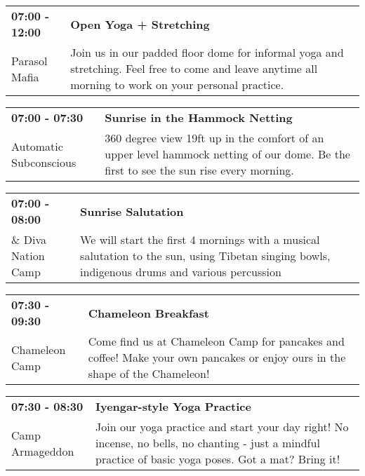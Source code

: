 \begin{tabular}{ p{1in} p{2.2in} }
    \textbf{07:00 - 12:00} & \textbf{Open Yoga + Stretching} \\
    Parasol Mafia \newline  & Join us in our padded floor dome for informal yoga and stretching. Feel free to come and leave anytime all morning to work on your personal practice. \\
    \hline 
\end{tabular}
    
\begin{tabular}{ p{1in} p{2.2in} }
    \textbf{07:00 - 07:30} & \textbf{Sunrise in the Hammock Netting} \\
    Automatic Subconscious \newline  & 360 degree view 19ft up in the comfort of an upper level hammock netting of our dome. Be the first to see the sun rise every morning. \\
    \hline 
\end{tabular}
    
\begin{tabular}{ p{1in} p{2.2in} }
    \textbf{07:00 - 08:00} & \textbf{Sunrise Salutation} \\
    \& \newline Diva Nation Camp & We will start the first 4 mornings with a musical salutation to the sun, using Tibetan singing bowls, indigenous drums and various percussion \\
    \hline 
\end{tabular}
    
\begin{tabular}{ p{1in} p{2.2in} }
    \textbf{07:30 - 09:30} & \textbf{Chameleon Breakfast} \\
    Chameleon Camp \newline  & Come find us at Chameleon Camp for pancakes and coffee! Make your own pancakes or enjoy ours in the shape of the Chameleon! \\
    \hline 
\end{tabular}
    
\begin{tabular}{ p{1in} p{2.2in} }
    \textbf{07:30 - 08:30} & \textbf{Iyengar-style Yoga Practice} \\
    Camp Armageddon \newline  & Join our yoga practice and start your day right! No incense, no bells, no chanting - just a mindful practice of basic yoga poses. Got a mat? Bring it! \\
    \hline 
\end{tabular}
    
